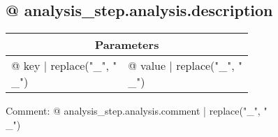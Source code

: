 \subsection{{@ analysis_step.analysis.description }}

\vspace*{1ex}
\begin{tabular}{ll}
\toprule
\multicolumn{2}{c}{\textbf{Parameters}}
\\
\midrule
{@ key | replace("_", "\\_") } & {@ value | replace("_", "\\_") }
\\
\bottomrule
\end{tabular}
\vspace*{1ex}

Comment: {@ analysis_step.analysis.comment | replace("_", "\\_") }
